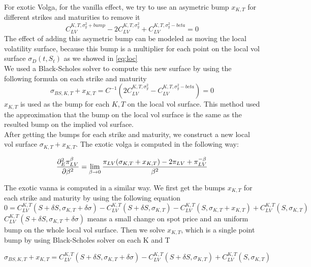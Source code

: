 \documentclass[12pt]{article}
\numberwithin{equation}{section}
\begin{document}
For exotic Volga, for the vanilla effect, we try to use an asymetric bump $x_{K,T}$ for different strikes and maturities to remove it
\begin{equation} \label{eq:8}
    C_{LV}^{K,T,\sigma_y^2+bump}-2 C_{LV}^{K,T,\sigma_y^2}+C_{LV}^{K,T,\sigma_y^2-beta}=0
\end{equation} 
The effect of adding this asymetric bump can be modeled as moving the local volatility surface, because this bump is 
a multiplier for each point on the local vol surface $\sigma_D(t,S_t)$ as we showed in \ref{eq:loc}\\
We used a Black-Scholes solver to compute this new surface by using the following formula on each strike and maturity
\begin{equation} 
    \sigma_{BS,K,T}+x_{K,T}=C^{-1}(2 C_{LV}^{K,T,\sigma_y^2}-C_{LV}^{K,T,\sigma_y^2-beta})=0
\end{equation} 
$x_{K,T}$ is used as the bump for each $K,T$ on the local vol surface.
This method used the approximation that the bump on the local vol surface is the same 
as the resulted bump on the implied vol surface.\\

After getting the bumps for each strike and maturity, we construct a new local vol surface $\sigma_{K,T}+x_{K,T}$.
The exotic volga is computed in the following way:

\begin{equation} \label{eq:6}
    \frac{\partial_E^2 \pi^\beta_{LV}}{\partial \beta^2}=\lim_{\beta \to 0}\frac{\pi_{LV}(\sigma_{K,T}+x_{K,T})-2\pi_{LV}+\pi_{LV}^{-\beta}}{\beta^2}\\
\end{equation} 


The exotic vanna is computed in a similar way. We first get the bumps $x_{K,T}$ for each strike and maturity by using the following equation
\begin{equation} \label{eq:9}
    0=C_{LV}^{K,T}(S+\delta S,\sigma_{K,T}+\delta \sigma)-C_{LV}^{K,T}(S+\delta S,\sigma_{K,T})-C_{LV}^{K,T}(S,\sigma_{K,T}+x_{K,T})+C_{LV}^{K,T}(S,\sigma_{K,T})
\end{equation} 
$C_{LV}^{K,T}(S+\delta S,\sigma_{K,T}+\delta \sigma)$ means a small change on spot price and an
uniform bump on the whole local vol surface.
Then we solve $x_{K,T}$, which is a single point bump by using Black-Scholes solver on each K and T

\[
    \sigma_{BS,K,T}+x_{K,T}=C_{LV}^{K,T}(S+\delta S,\sigma_{K,T}+\delta \sigma)-C_{LV}^{K,T}(S+\delta S,\sigma_{K,T})+C_{LV}^{K,T}(S,\sigma_{K,T})
\]
\end{document}
